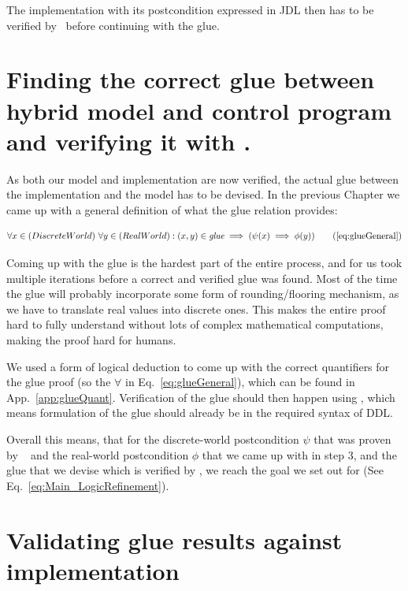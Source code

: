 The implementation with its postcondition expressed in JDL then has to be verified by \key~before continuing with the glue. 

\section{Finding the correct glue between hybrid model and control program and verifying it with \keym.}
\label{sec:Process:Glue}

As both our model and implementation are now verified, the actual glue between the implementation and the model has to be devised. In the previous Chapter we came up with a general definition of what the glue relation provides:

\begin{equation}
	\centering
	\begin{split}
		\forall x \in (Discrete World)~\forall y \in (Real World):(x,y) \in \textit{glue} \implies (\psi(x) \implies \phi(y))
	\end{split}
	\tag{\ref{eq:glueGeneral}}
\end{equation}

Coming up with the glue is the hardest part of the entire process, and for us took multiple iterations before a correct and verified glue was found. Most of the time the glue will probably incorporate some form of rounding/flooring mechanism, as we have to translate real values into discrete ones. This makes the entire proof hard to fully understand without lots of complex mathematical computations, making the proof hard for humans.

We used a form of logical deduction to come up with the correct quantifiers for the glue proof (so the \(\forall\) in Eq.~\ref{eq:glueGeneral}), which can be found in App.~\ref{app:glueQuant}. Verification of the glue should then happen using \keym, which means formulation of the glue should already be in the required syntax of DDL.

Overall this means, that for the discrete-world postcondition \(\psi\) that was proven by \key~ and the real-world postcondition \(\phi\) that we came up with in step 3, and the glue that we devise which is verified by \keym, we reach the goal we set out for (See Eq.~\ref{eq:Main_LogicRefinement}).

\section{Validating glue results against implementation}
\label{sec:Process:Eval}

